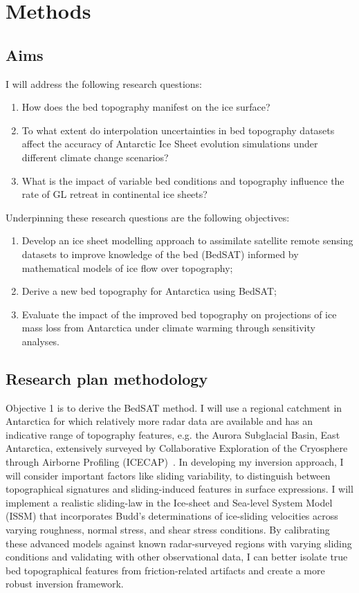 \chapter{Methods}
\section{Aims}

I will address the following research questions:
\begin{enumerate}

    \item How does the bed topography manifest on the ice surface?

    \item To what extent do interpolation uncertainties in bed topography datasets affect the accuracy of Antarctic Ice Sheet evolution simulations under different climate change scenarios?

    \item What is the impact of variable bed conditions and topography influence the rate of GL retreat in continental ice sheets?

\end{enumerate}
Underpinning these research questions are the following objectives:
\begin{enumerate}
    \item Develop an ice sheet modelling approach to assimilate satellite remote sensing datasets to improve knowledge of the bed (BedSAT) informed by mathematical models of ice flow over topography;
    \item Derive a new bed topography for Antarctica using BedSAT;
    \item Evaluate the impact of the improved bed topography on projections of ice mass loss from Antarctica under climate warming through sensitivity analyses. 
\end{enumerate}

\section{Research plan methodology}

Objective 1 is to derive the BedSAT method. I will use a regional catchment in Antarctica for which relatively more radar data are available and has an indicative range of topography features, e.g. the Aurora Subglacial Basin, East Antarctica, extensively surveyed by Collaborative Exploration of the Cryosphere through Airborne Profiling (ICECAP)~\cite{Young_2011}. In developing my inversion approach, I will consider important factors like sliding variability, to distinguish between topographical signatures and sliding-induced features in surface expressions. I will implement a realistic sliding-law in the Ice-sheet and Sea-level System Model (ISSM) that incorporates Budd's  determinations of ice-sliding velocities across varying roughness, normal stress, and shear stress conditions. By calibrating these advanced models against known radar-surveyed regions with varying sliding conditions and validating with other observational data, I can better isolate true bed topographical features from friction-related artifacts and create a more robust inversion framework.


